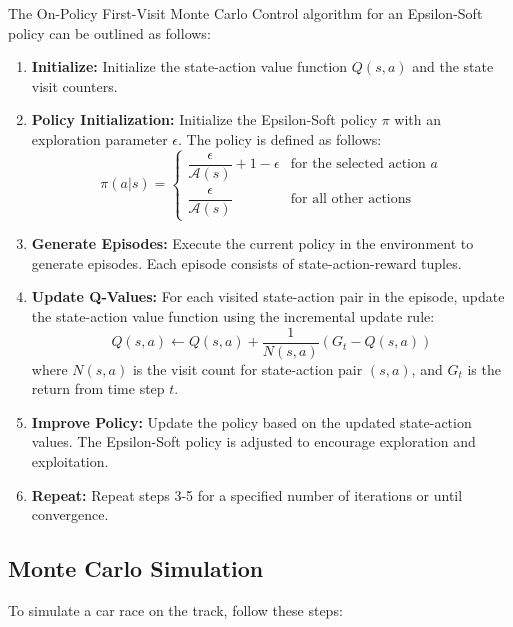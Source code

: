 \documentclass{article}
\begin{document}
The On-Policy First-Visit Monte Carlo Control algorithm for an Epsilon-Soft policy can be outlined as follows:

\begin{enumerate}
    \item \textbf{Initialize:} Initialize the state-action value function \(Q(s, a)\) and the state visit counters.
    
    \item \textbf{Policy Initialization:} Initialize the Epsilon-Soft policy \(\pi\) with an exploration parameter \(\epsilon\). The policy is defined as follows:
    \[
    \pi(a|s) = \begin{cases} 
      \dfrac{\epsilon}{\mathcal{A}(s)} + 1 - \epsilon & \text{for the selected action } a \\[2em]
      \dfrac{\epsilon}{\mathcal{A}(s)} & \text{for all other actions}
   \end{cases}
    \]
    
    \item \textbf{Generate Episodes:} Execute the current policy in the environment to generate episodes. Each episode consists of state-action-reward tuples.

    \item \textbf{Update Q-Values:} For each visited state-action pair in the episode, update the state-action value function using the incremental update rule:
    \[
    Q(s, a) \leftarrow Q(s, a) + \frac{1}{N(s, a)}(G_t - Q(s, a))
    \]
    where \(N(s, a)\) is the visit count for state-action pair \((s, a)\), and \(G_t\) is the return from time step \(t\).

    \item \textbf{Improve Policy:} Update the policy based on the updated state-action values. The Epsilon-Soft policy is adjusted to encourage exploration and exploitation.

    \item \textbf{Repeat:} Repeat steps 3-5 for a specified number of iterations or until convergence.

\end{enumerate}

\subsection{Monte Carlo Simulation}
To simulate a car race on the track, follow these steps:
\end{document}
